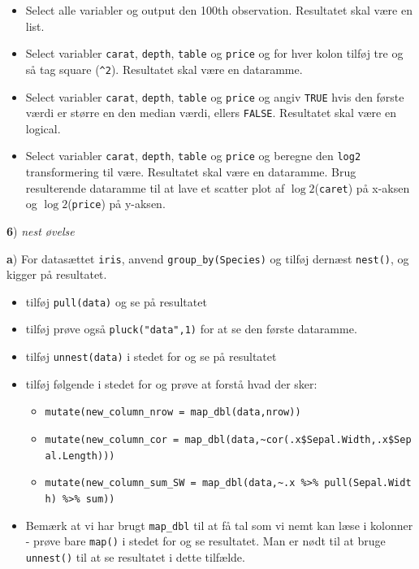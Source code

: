 \documentclass[
]{book}
\providecommand{\tightlist}{%
  \setlength{\itemsep}{0pt}\setlength{\parskip}{0pt}}
\begin{document}
\begin{itemize}
\tightlist
\item
  Select alle variabler og output den 100th observation. Resultatet skal være en list.
\item
  Select variabler \texttt{carat}, \texttt{depth}, \texttt{table} og \texttt{price} og for hver kolon tilføj tre og så tag square (\texttt{\^{}2}). Resultatet skal være en dataramme.
\item
  Select variabler \texttt{carat}, \texttt{depth}, \texttt{table} og \texttt{price} og angiv \texttt{TRUE} hvis den første værdi er større en den median værdi, ellers \texttt{FALSE}. Resultatet skal være en logical.
\item
  Select variabler \texttt{carat}, \texttt{depth}, \texttt{table} og \texttt{price} og beregne den \texttt{log2} transformering til være. Resultatet skal være en dataramme. Brug resulterende dataramme til at lave et scatter plot af \(\log2\)(\texttt{caret}) på x-aksen og \(\log2\)(\texttt{price}) på y-aksen.
\end{itemize}

\textbf{6}) \emph{nest øvelse}

\textbf{a}) For datasættet \texttt{iris}, anvend \texttt{group\_by(Species)} og tilføj dernæst \texttt{nest()}, og kigger på resultatet.

\begin{itemize}
\tightlist
\item
  tilføj \texttt{pull(data)} og se på resultatet
\item
  tilføj prøve også \texttt{pluck("data",1)} for at se den første dataramme.
\item
  tilføj \texttt{unnest(data)} i stedet for og se på resultatet
\item
  tilføj følgende i stedet for og prøve at forstå hvad der sker:

  \begin{itemize}
  \tightlist
  \item
    \texttt{mutate(new\_column\_nrow\ =\ map\_dbl(data,nrow))}
  \item
    \texttt{mutate(new\_column\_cor\ =\ map\_dbl(data,\textasciitilde{}cor(.x\$Sepal.Width,.x\$Sepal.Length)))}
  \item
    \texttt{mutate(new\_column\_sum\_SW\ =\ map\_dbl(data,\textasciitilde{}.x\ \%\textgreater{}\%\ pull(Sepal.Width)\ \%\textgreater{}\%\ sum))}
  \end{itemize}
\item
  Bemærk at vi har brugt \texttt{map\_dbl} til at få tal som vi nemt kan læse i kolonner - prøve bare \texttt{map()} i stedet for og se resultatet. Man er nødt til at bruge \texttt{unnest()} til at se resultatet i dette tilfælde.
\end{itemize}
\end{document}
